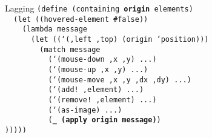 \begin{frame}{Lagging}
  \footnotesize
  \texttt{(define (containing \textbf{origin} elements)\\
    \ \ (let ((hovered-element \#false))\\
    \ \ \ \ (lambda message\\
    \ \ \ \ \ \ (let ((`(,left ,top) (origin 'position)))\\
    \ \ \ \ \ \ \ \ (match message\\
    \ \ \ \ \ \ \ \ \ \ (`(mouse-down ,x ,y) ...)\\
    \ \ \ \ \ \ \ \ \ \ (`(mouse-up ,x ,y) ...)\\
    \ \ \ \ \ \ \ \ \ \ (`(mouse-move ,x ,y ,dx ,dy) ...)\\
    \ \ \ \ \ \ \ \ \ \ (`(add!\ ,element) ...)\\
    \ \ \ \ \ \ \ \ \ \ (`(remove!\ ,element) ...)\\
    \ \ \ \ \ \ \ \ \ \ (`(as-image) ...)\\
    \ \ \ \ \ \ \ \ \ \ (\textbf{\_ (apply origin message)})\\
    )))))\\
    \ \\
    \ \\
    \ \\
    \ \\
    \ \\
    \ \\
    \ \\
    \ \\
    \ \\
    \ \\
    \ 
  }
\end{frame}

